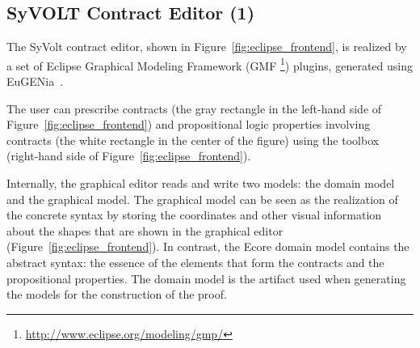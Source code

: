 \subsection{SyVOLT Contract Editor (1)}

The SyVolt contract editor, shown in Figure~\ref{fig:eclipse_frontend}, is
realized by a set of Eclipse Graphical Modeling Framework (GMF
\footnote{\url{http://www.eclipse.org/modeling/gmp/}}) plugins, generated using
EuGENia~\cite{Kolovos2010a}.

The user can prescribe contracts (the gray rectangle in the left-hand side of
Figure~\ref{fig:eclipse_frontend}) and propositional logic properties involving
contracts (the white rectangle in the center of the figure) using the toolbox (right-hand side of Figure~\ref{fig:eclipse_frontend}).

Internally, the graphical editor reads and write two models: the domain model and the graphical model.
The graphical model can be seen as the realization of the concrete syntax by storing the coordinates and other visual information about the shapes that are shown in the graphical editor (Figure~\ref{fig:eclipse_frontend}). 
In contrast, the Ecore domain model contains the abstract syntax: the essence of
the elements that form the contracts and the propositional properties.
The domain model is the artifact used when generating the models for the construction of the proof.

